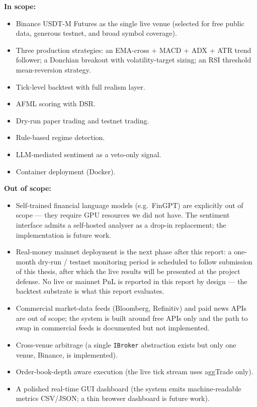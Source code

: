 \documentclass[a4paper, 12pt, titlepage]{article}
\begin{document}
\textbf{In scope:}

\begin{itemize}[noitemsep]
    \item Binance USDT-M Futures as the single live venue (selected
    for free public data, generous testnet, and broad symbol coverage).
    \item Three production strategies: an EMA-cross + MACD + ADX +
    ATR trend follower; a Donchian breakout with volatility-target
    sizing; an RSI threshold mean-reversion strategy.
    \item Tick-level backtest with full realism layer.
    \item AFML scoring with DSR.
    \item Dry-run paper trading and testnet trading.
    \item Rule-based regime detection.
    \item LLM-mediated sentiment as a veto-only signal.
    \item Container deployment (Docker).
\end{itemize}

\textbf{Out of scope:}

\begin{itemize}[noitemsep]
    \item Self-trained financial language models (e.g.\ FinGPT) are
    explicitly out of scope --- they require GPU resources we did
    not have. The sentiment interface admits a self-hosted analyser
    as a drop-in replacement; the implementation is future work.
    \item Real-money mainnet deployment is the next phase after this
    report: a one-month dry-run / testnet monitoring period is
    scheduled to follow submission of this thesis, after which the
    live results will be presented at the project defense. No live
    or mainnet PnL is reported in this report by design --- the
    backtest substrate is what this report evaluates.
    \item Commercial market-data feeds (Bloomberg, Refinitiv) and
    paid news APIs are out of scope; the system is built around
    free APIs only and the path to swap in commercial feeds is
    documented but not implemented.
    \item Cross-venue arbitrage (a single \texttt{IBroker} abstraction
    exists but only one venue, Binance, is implemented).
    \item Order-book-depth aware execution (the live tick stream uses
    aggTrade only).
    \item A polished real-time GUI dashboard (the system emits
    machine-readable metrics CSV/JSON; a thin browser dashboard is
    future work).
\end{itemize}
\end{document}

